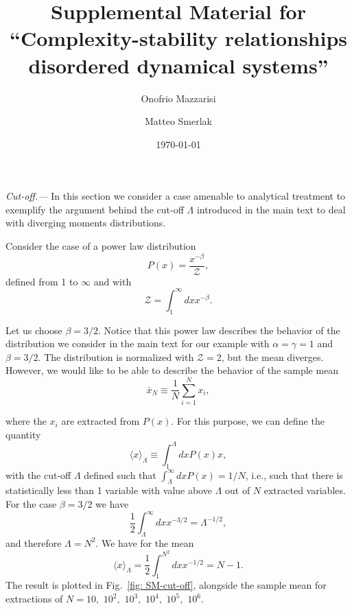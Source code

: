 \documentclass[aps,prl,superscriptaddress,twocolumn]{revtex4}
\begin{document}
\title{\Large Supplemental Material for ``Complexity-stability relationships disordered dynamical systems''}

\author{Onofrio Mazzarisi}

\author{Matteo Smerlak}


\date{\today}


\maketitle

{\it Cut-off.---} In this section we consider a case amenable to analytical treatment to exemplify the argument behind the cut-off $\Lambda$ introduced in the main text to deal with diverging moments distributions.

Consider the case of a power law distribution 
\begin{equation}
  P(x)=\frac{x^{-\beta}}{\mathcal{Z}} ,
\end{equation}
defined from 1 to $\infty$ and with 
\begin{equation}
  \mathcal{Z}=\int_1^{\infty}dxx^{-\beta}.  
\end{equation}

Let us choose $\beta=3/2$. Notice that this power law describes the behavior of the distribution we consider in the main text for our example with $\alpha=\gamma=1$ and $\beta=3/2$.
The distribution is normalized with $\mathcal{Z}=2$, but the mean diverges. However, we would like to be able to describe the behavior of the sample mean 
\begin{equation}
  \bar{x}_N\equiv\frac{1}{N}\sum_{i=1}^Nx_i,
\end{equation}

where the $x_i$ are extracted from $P(x)$.
For this purpose, we can define the quantity
\begin{equation}
  \langle x\rangle_{\Lambda}\equiv\int_1^{\Lambda}dxP(x)x,
\end{equation}
with the cut-off $\Lambda$ defined such that $\int_{\Lambda}^{\infty}dxP(x)=1/N$, i.e., such that there is statistically less than 1 variable with value above $\Lambda$ out of $N$ extracted variables. For the case $\beta=3/2$ we have 
\begin{equation}
  \frac{1}{2}\int_{\Lambda}^{\infty}dxx^{-3/2}=\Lambda^{-1/2},
\end{equation}
and therefore $\Lambda=N^2$. We have for the mean
\begin{equation}
  \langle x\rangle_{\Lambda}=\frac{1}{2}\int_1^{N^2}dxx^{-1/2} = N-1.
\end{equation}
The result is plotted in Fig.~\ref{fig: SM-cut-off}, alongside the sample mean for extractions of $N=10,$ $10^2,$ $10^3,$ $10^4,$ $10^5,$ $10^6$.
\end{document}
